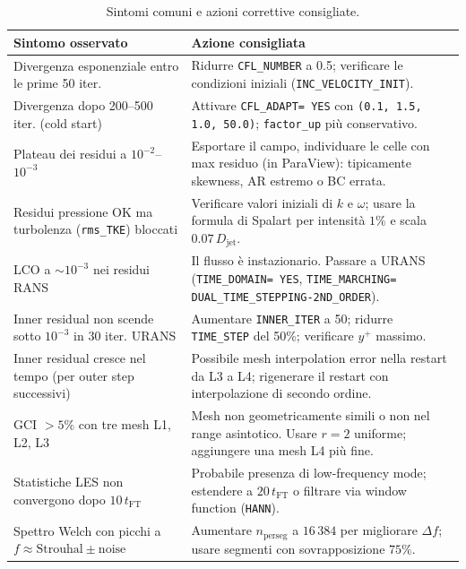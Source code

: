\documentclass[11pt,a4paper]{article}
\newcommand{\ttcfg}[1]{\texttt{\color{codegray}#1}}
\newcommand{\Djet}{D_{\mathrm{jet}}}
\newcommand{\tFT}{t_{\mathrm{FT}}}
\begin{document}
\begin{table}[H]
  \centering
  \caption{Sintomi comuni e azioni correttive consigliate.}
  \label{tab:troubleshoot}
  \small
  \begin{tabularx}{\textwidth}{p{4cm}X}
    \toprule
    \rowcolor{tablehead}
    \textbf{Sintomo osservato} & \textbf{Azione consigliata} \\
    \midrule
    Divergenza esponenziale entro le prime 50 iter. &
      Ridurre \ttcfg{CFL\_NUMBER} a 0.5; verificare le condizioni
      iniziali (\ttcfg{INC\_VELOCITY\_INIT}). \\
    Divergenza dopo 200--500 iter. (cold start) &
      Attivare \ttcfg{CFL\_ADAPT= YES} con \texttt{(0.1, 1.5, 1.0, 50.0)};
      \texttt{factor\_up} più conservativo. \\
    Plateau dei residui a $10^{-2}$--$10^{-3}$ &
      Esportare il campo, individuare le celle con max residuo (in
      ParaView): tipicamente skewness, AR estremo o BC errata. \\
    Residui pressione OK ma turbolenza (\ttcfg{rms\_TKE}) bloccati &
      Verificare valori iniziali di $k$ e $\omega$; usare la formula
      di Spalart per intensità $1\%$ e scala $0.07\,\Djet$. \\
    LCO a $\sim 10^{-3}$ nei residui RANS &
      Il flusso è instazionario. Passare a URANS (\ttcfg{TIME\_DOMAIN=
      YES}, \ttcfg{TIME\_MARCHING= DUAL\_TIME\_STEPPING-2ND\_ORDER}). \\
    Inner residual non scende sotto $10^{-3}$ in 30 iter. URANS &
      Aumentare \ttcfg{INNER\_ITER} a 50; ridurre \ttcfg{TIME\_STEP}
      del 50\%; verificare $y^+$ massimo. \\
    Inner residual cresce nel tempo (per outer step successivi) &
      Possibile mesh interpolation error nella restart da L3 a L4;
      rigenerare il restart con interpolazione di secondo ordine. \\
    GCI $> 5\%$ con tre mesh L1, L2, L3 &
      Mesh non geometricamente simili o non nel range asintotico. Usare
      $r=2$ uniforme; aggiungere una mesh L4 più fine. \\
    Statistiche LES non convergono dopo $10\,\tFT$ &
      Probabile presenza di low-frequency mode; estendere a $20\,\tFT$
      o filtrare via window function (\texttt{HANN}). \\
    Spettro Welch con picchi a $f \approx \mathrm{Strouhal}\pm\mathrm{noise}$ &
      Aumentare $n_{\mathrm{perseg}}$ a $16\,384$ per migliorare
      $\Delta f$; usare segmenti con sovrapposizione $75\%$. \\
    \bottomrule
  \end{tabularx}
\end{table}
\end{document}

